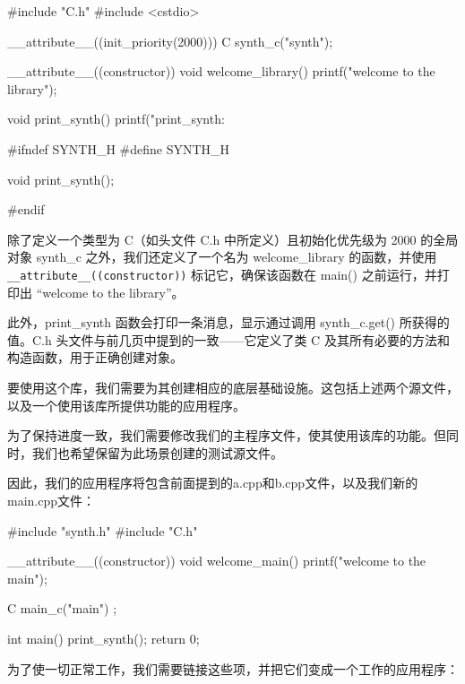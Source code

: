 \begin{cpp}
#include "C.h"
#include <cstdio>

__attribute__((init_priority(2000))) C synth_c("synth");

__attribute__((constructor)) void welcome_library() {
  printf("welcome to the library\n");
}

void print_synth() {
  printf("print_synth: %
}
\end{cpp}


\begin{cpp}
#ifndef SYNTH_H
#define SYNTH_H

void print_synth();

#endif
\end{cpp}

除了定义一个类型为 C（如头文件 C.h 中所定义）且初始化优先级为 2000 的全局对象 synth\_c 之外，我们还定义了一个名为 welcome\_library 的函数，并使用 \verb|__attribute__((constructor))| 标记它，确保该函数在 main() 之前运行，并打印出 “welcome to the library”。

此外，print\_synth 函数会打印一条消息，显示通过调用 synth\_c.get() 所获得的值。C.h 头文件与前几页中提到的一致——它定义了类 C 及其所有必要的方法和构造函数，用于正确创建对象。

要使用这个库，我们需要为其创建相应的底层基础设施。这包括上述两个源文件，以及一个使用该库所提供功能的应用程序。

为了保持进度一致，我们需要修改我们的主程序文件，使其使用该库的功能。但同时，我们也希望保留为此场景创建的测试源文件。

因此，我们的应用程序将包含前面提到的a.cpp和b.cpp文件，以及我们新的main.cpp文件：


\begin{cpp}
#include "synth.h"
#include "C.h"

__attribute__((constructor)) void welcome_main() {
  printf("welcome to the main\n");
}

C main_c("main") ;

int main() {
  print_synth();
  return 0;
}
\end{cpp}

为了使一切正常工作，我们需要链接这些项，并把它们变成一个工作的应用程序：



